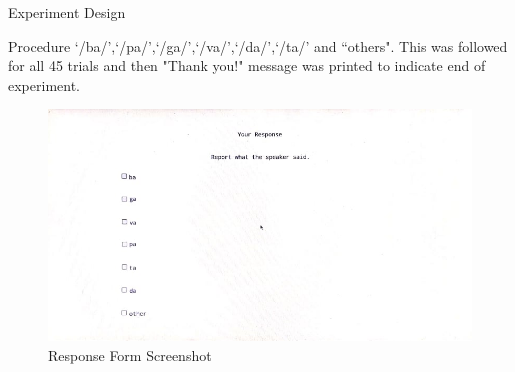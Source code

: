 \documentclass{article}
\begin{document}
\begin{psection}{Experiment Design}
\begin{psubsection}{Procedure}
		`/ba/',`/pa/',`/ga/',`/va/',`/da/',`/ta/' and ``others". This was followed for all 45 trials and then "Thank you!" message was printed to indicate end of experiment.

		\begin{figure}[H]
			\centering
			\includegraphics[width=1\textwidth]{includes/response.jpg}
			\caption{Response Form Screenshot}
		\end{figure}

	\end{psubsection}

\end{psection}
\end{document}
